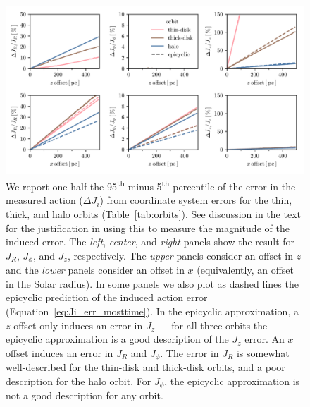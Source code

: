 \documentclass[twocolumn]{aastex62}
\newcommand{\uth}{\textsuperscript{th}}
\begin{document}
\begin{figure}
\begin{center}
\includegraphics[width=\textwidth]{fig/schmactions_many_orbits.pdf}
\end{center}
\caption{We report one half the 95\uth{} minus 5\uth{} percentile of the error
in the measured action ($\Delta J_i$) from coordinate system errors for the
thin, thick, and halo orbits (Table~\ref{tab:orbits}). See discussion in the
text for the justification in using this to measure the magnitude of the
induced error. The {\em left}, {\em center}, and {\em right} panels show the
result for $J_R$, $J_{\phi}$, and $J_z$, respectively. The {\em upper} panels
consider an offset in $z$ and the {\em lower} panels consider an offset in $x$
(equivalently, an offset in the Solar radius). In some panels we also plot as
dashed lines the epicyclic prediction of the induced action error
(Equation~\eqref{eq:Ji_err_mosttime}). In the epicyclic approximation, a $z$
offset only induces an error in $J_z$ --- for all three orbits the epicyclic
approximation is a good description of the $J_z$ error. An $x$ offset induces
an error in $J_R$ and $J_{\phi}$. The error in $J_R$ is somewhat
well-described for the thin-disk and thick-disk orbits, and a poor description
for the halo orbit. For $J_{\phi}$, the epicyclic approximation is not a good
description for any orbit.}
\label{fig:many_orbit_wrong_ref}
\end{figure}
\end{document}
